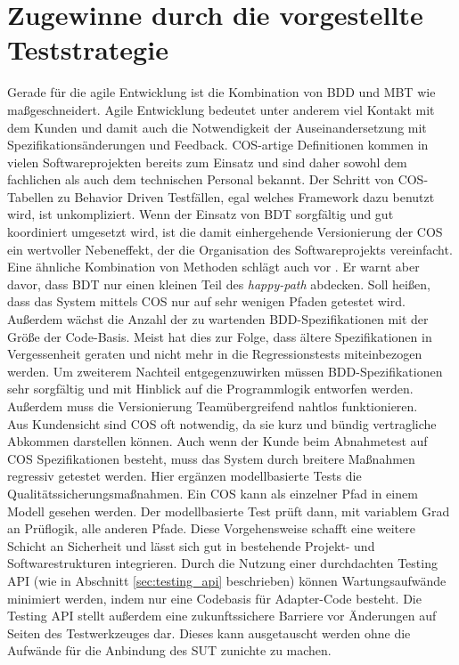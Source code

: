 \section{Zugewinne durch die vorgestellte Teststrategie}
Gerade für die agile Entwicklung ist die Kombination von BDD und \Gls{MBT} wie maßgeschneidert. Agile Entwicklung bedeutet unter anderem viel Kontakt mit dem Kunden und damit auch die Notwendigkeit der Auseinandersetzung mit Spezifikationsänderungen und Feedback. \Gls{COS}-artige Definitionen kommen in vielen Softwareprojekten bereits zum Einsatz und sind daher sowohl dem fachlichen als auch dem technischen Personal bekannt. Der Schritt von \Gls{COS}-Tabellen zu Behavior Driven Testfällen, egal welches Framework dazu benutzt wird, ist unkompliziert. Wenn der Einsatz von \Gls{BDT} sorgfältig und gut koordiniert umgesetzt wird, ist die damit einhergehende Versionierung der \Gls{COS} ein wertvoller Nebeneffekt, der die Organisation des Softwareprojekts vereinfacht.\\
Eine ähnliche Kombination von Methoden schlägt auch \citeauthor{binder_model-based_2014} vor \cite{binder_model-based_2014}. Er warnt aber davor, dass \Gls{BDT} nur einen kleinen Teil des \textit{happy-path} abdecken. Soll heißen, dass das System mittels \Gls{COS} nur auf sehr wenigen Pfaden getestet wird. Außerdem wächst die Anzahl der zu wartenden \Gls{BDD}-Spezifikationen mit der Größe der Code-Basis. Meist hat dies zur Folge, dass ältere Spezifikationen in Vergessenheit geraten und nicht mehr in die Regressionstests miteinbezogen werden. Um zweiterem Nachteil entgegenzuwirken müssen \Gls{BDD}-Spezifikationen sehr sorgfältig und mit Hinblick auf die Programmlogik entworfen werden. Außerdem muss die Versionierung Teamübergreifend nahtlos funktionieren.\\
Aus Kundensicht sind \Gls{COS} oft notwendig, da sie kurz und bündig vertragliche Abkommen darstellen können. Auch wenn der Kunde beim Abnahmetest auf \Gls{COS} Spezifikationen besteht, muss das System durch breitere Maßnahmen regressiv getestet werden. Hier ergänzen modellbasierte Tests die Qualitätssicherungsmaßnahmen. Ein \Gls{COS} kann als einzelner Pfad in einem Modell gesehen werden. Der modellbasierte Test prüft dann, mit variablem Grad an Prüflogik, alle anderen Pfade. Diese Vorgehensweise schafft eine weitere Schicht an Sicherheit und lässt sich gut in bestehende Projekt- und Softwarestrukturen integrieren. Durch die Nutzung einer durchdachten Testing API (wie in Abschnitt \ref{sec:testing_api} beschrieben) können Wartungsaufwände minimiert werden, indem nur eine Codebasis für Adapter-Code besteht. Die Testing API stellt außerdem eine zukunftssichere Barriere vor Änderungen auf Seiten des Testwerkzeuges dar. Dieses kann ausgetauscht werden ohne die Aufwände für die Anbindung des \Gls{SUT} zunichte zu machen.\\
